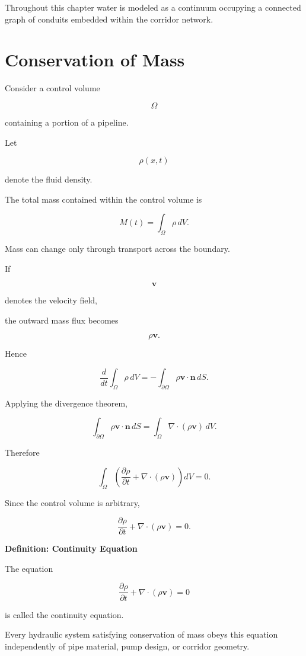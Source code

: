 \documentclass[11pt,fleqn]{book}
\numberwithin{equation}{chapter}
\newenvironment{definition}[1]
  {\begin{definitionEnv}
   \noindent\textbf{Definition: #1}\par\smallskip}
  {\end{definitionEnv}}
\theoremstyle{plain}
\theoremstyle{definition}
\theoremstyle{remark}
\begin{document}
Throughout this chapter water is modeled as a continuum occupying a
connected graph of conduits embedded within the corridor network.


\section{Conservation of Mass}

Consider a control volume

\[
\Omega
\]

containing a portion of a pipeline.

Let

\[
\rho(x,t)
\]

denote the fluid density.

The total mass contained within the control volume is

\[
M(t)
=
\int_{\Omega}
\rho
\,dV.
\]

Mass can change only through transport across the boundary.

If

\[
\mathbf v
\]

denotes the velocity field,

the outward mass flux becomes

\[
\rho\mathbf v.
\]

Hence

\[
\frac{d}{dt}
\int_{\Omega}
\rho\,dV
=
-
\int_{\partial\Omega}
\rho
\mathbf v
\cdot
\mathbf n
\,dS.
\]


Applying the divergence theorem,

\[
\int_{\partial\Omega}
\rho
\mathbf v
\cdot
\mathbf n
\,dS
=
\int_{\Omega}
\nabla\cdot
(\rho\mathbf v)
\,dV.
\]

Therefore

\[
\int_\Omega
\left(
\frac{\partial\rho}{\partial t}
+
\nabla\cdot
(\rho\mathbf v)
\right)
dV
=
0.
\]

Since the control volume is arbitrary,

\[
\boxed{
\frac{\partial\rho}{\partial t}
+
\nabla\cdot(\rho\mathbf v)
=
0.
}
\]


\begin{definition}{Continuity Equation}

The equation

\[
\frac{\partial\rho}{\partial t}
+
\nabla\cdot(\rho\mathbf v)
=
0
\]

is called the continuity equation.

Every hydraulic system satisfying conservation of mass obeys this
equation independently of pipe material, pump design, or corridor
geometry.

\end{definition}
\end{document}
